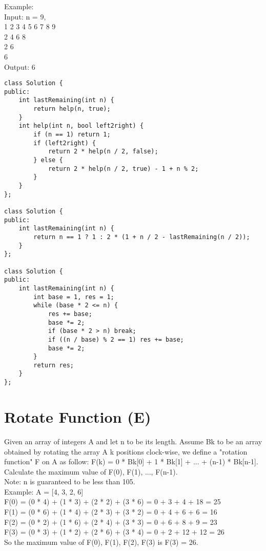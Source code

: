 Example:\\
Input: n = 9,\\
1 2 3 4 5 6 7 8 9\\
2 4 6 8\\
2 6\\
6\\
Output: 6\\

\begin{lstlisting}
class Solution {
public:
    int lastRemaining(int n) {
        return help(n, true);    
    }
    int help(int n, bool left2right) {
        if (n == 1) return 1;
        if (left2right) {
            return 2 * help(n / 2, false);
        } else {
            return 2 * help(n / 2, true) - 1 + n % 2;
        }
    }
};

class Solution {
public:
    int lastRemaining(int n) {
        return n == 1 ? 1 : 2 * (1 + n / 2 - lastRemaining(n / 2));    
    }
};

class Solution {
public:
    int lastRemaining(int n) {
        int base = 1, res = 1;
        while (base * 2 <= n) {
            res += base;
            base *= 2;
            if (base * 2 > n) break;
            if ((n / base) % 2 == 1) res += base;
            base *= 2;
        }
        return res;
    }
};
\end{lstlisting}


\section{Rotate Function (E)}
Given an array of integers A and let n to be its length. Assume Bk to be an array obtained by rotating the array A k positions clock-wise, we define a "rotation function" F on A as follow:
F(k) = 0 * Bk[0] + 1 * Bk[1] + ... + (n-1) * Bk[n-1].\\

Calculate the maximum value of F(0), F(1), ..., F(n-1).\\

Note:
n is guaranteed to be less than 105.\\

Example:
A = [4, 3, 2, 6]\\
F(0) = (0 * 4) + (1 * 3) + (2 * 2) + (3 * 6) = 0 + 3 + 4 + 18 = 25\\
F(1) = (0 * 6) + (1 * 4) + (2 * 3) + (3 * 2) = 0 + 4 + 6 + 6 = 16\\
F(2) = (0 * 2) + (1 * 6) + (2 * 4) + (3 * 3) = 0 + 6 + 8 + 9 = 23\\
F(3) = (0 * 3) + (1 * 2) + (2 * 6) + (3 * 4) = 0 + 2 + 12 + 12 = 26\\
So the maximum value of F(0), F(1), F(2), F(3) is F(3) = 26.\\

